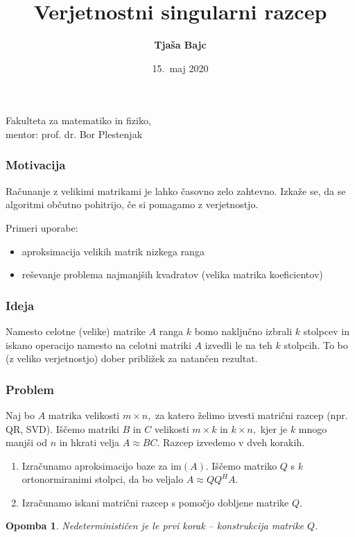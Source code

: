 \documentclass{beamer}
\title{Verjetnostni singularni razcep}
\author[Tjaša Bajc]{\textbf {Tjaša Bajc}}
\date{15.\ maj 2020}
\newtheorem{opomba}{Opomba}
\begin{document}

\begin{frame}
\titlepage
Fakulteta za matematiko in fiziko, \\
mentor: prof. dr. Bor Plestenjak
\end{frame}


\begin{frame}
\frametitle{Motivacija}
Računanje z velikimi matrikami je lahko časovno zelo zahtevno. Izkaže se, da se algoritmi občutno pohitrijo, če si pomagamo z verjetnostjo.

Primeri uporabe:
\begin{itemize}
\item aproksimacija velikih matrik nizkega ranga
\item reševanje problema najmanjših kvadratov (velika matrika koeficientov)
\end{itemize}

\end{frame}


\begin{frame}
\frametitle{Ideja}
Namesto celotne (velike) matrike $A$ ranga $k$ bomo naključno izbrali $k$ stolpcev in iskano operacijo namesto na celotni matriki $A$ izvedli le na teh $k$ stolpcih. To bo (z veliko verjetnostjo) dober približek za natančen rezultat.

\end{frame}



\begin{frame}
\frametitle{Problem}

Naj bo $A$ matrika velikosti $m \times n,$ za katero želimo izvesti  matrični razcep  (npr. QR, SVD). Iščemo matriki $B$ in $C$ velikosti $m \times k$ in $k \times n,$ kjer je $k$ mnogo manjši od $n$ in hkrati velja $A \approx BC.$ Razcep izvedemo v dveh korakih.

\begin{enumerate}
\item Izračunamo aproksimacijo baze za $\text{im} (A).$ Iščemo matriko $Q$ s $k$ ortonormiranimi stolpci, da bo veljalo $A \approx Q Q^{H} A.$ 
\item Izračunamo iskani matrični razcep s pomočjo dobljene matrike $Q.$\newline
\end{enumerate}


% 

\pause
\begin{opomba}
Nedeterminističen je le prvi korak -- konstrukcija matrike $Q$.
\end{opomba}

\end{frame}
\end{document}
